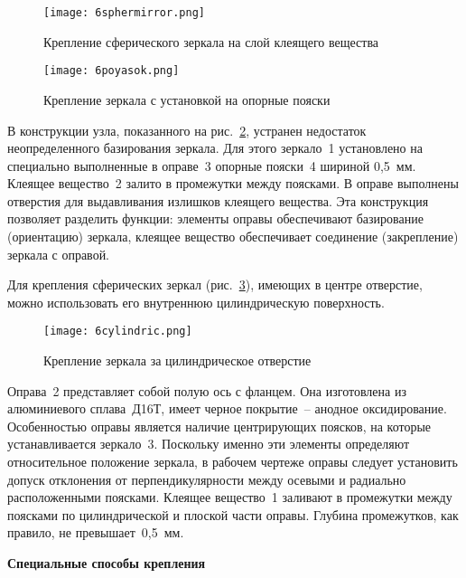 \begin{figure}[h!]
	\caption{ Крепление сферического зеркала на слой клеящего вещества }
	\texttt{[image: 6sphermirror.png]}
	\label{pic:6sphermirror}
\end{figure}

\begin{figure}[h!]
	\caption{ Крепление зеркала с установкой на опорные пояски }
	\texttt{[image: 6poyasok.png]}
	\label{pic:6poyasok}
\end{figure}

В конструкции узла, показанного на рис.~\ref{pic:6poyasok}, устранен недостаток неопределенного базирования зеркала. Для этого зеркало~1 установлено на специально выполненные в оправе~3 опорные пояски~4 шириной 0,5~мм. Клеящее вещество~2 залито в промежутки между поясками. В оправе выполнены отверстия для выдавливания излишков клеящего вещества. Эта конструкция позволяет разделить функции: элементы оправы обеспечивают базирование (ориентацию) зеркала, клеящее вещество обеспечивает соединение (закрепление) зеркала с оправой.

Для крепления сферических зеркал (рис.~\ref{pic:6cylindric}), имеющих в центре отверстие, можно использовать его внутреннюю цилиндрическую поверхность.

\begin{figure}[h!]
	\caption{ Крепление зеркала за цилиндрическое отверстие }
	\texttt{[image: 6cylindric.png]}
	\label{pic:6cylindric}
\end{figure}

Оправа~2 представляет собой полую ось с фланцем. Она изготовлена из алюминиевого сплава~Д16Т, имеет черное покрытие~-- анодное оксидирование. Особенностью оправы является наличие центрирующих поясков, на которые устанавливается зеркало~3. Поскольку именно эти элементы определяют относительное положение зеркала, в рабочем чертеже оправы следует установить допуск отклонения от перпендикулярности между осевыми и радиально расположенными поясками. Клеящее вещество~1 заливают в промежутки между поясками по цилиндрической и плоской части оправы. Глубина промежутков, как правило, не превышает~0,5~мм.

\begin{flushleft}
	\textbf{Специальные способы крепления}
\end{flushleft}

